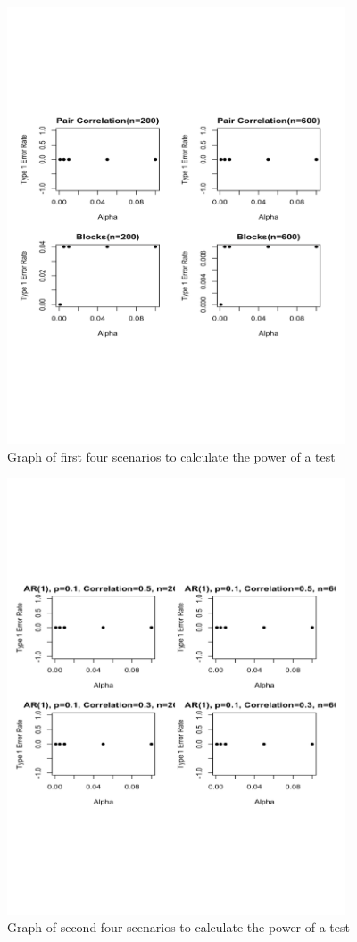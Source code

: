 \documentclass[12pt, letterpaper]{article}
\begin{document}
\begin{figure}[!hb]
\centering
\includegraphics[width=10cm]{Powergraph1nonparam.pdf}
\caption{Graph of first four scenarios to calculate the power of a test}
\label{fig: Power Graphs 1}
\end{figure}

\begin{figure}[!hb]
\centering
\includegraphics[width=10cm]{Powergraph2nonparam.pdf}
\caption{Graph of second four scenarios to calculate the power of a test}
\label{fig: Power Graphs 2}
\end{figure}
\end{document}

